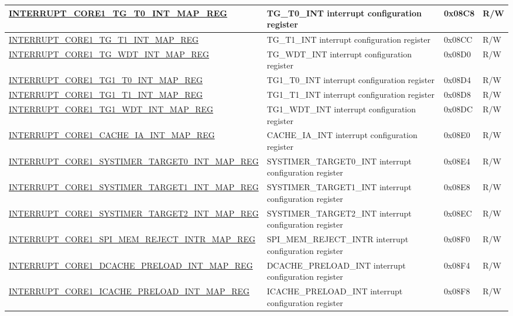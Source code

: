 \begin{landscape}
\begin{longtable}{ | p{10cm} | p{10.2cm} | p{1.3cm} | p{1cm} | }
\hyperref[regdesc:INTERRUPTCORE1TGT0INTMAPREG]{INTERRUPT\_CORE1\_TG\_T0\_INT\_MAP\_REG} & TG\_T0\_INT interrupt configuration register & 0x08C8 & R/W \\ \hline
\hyperref[regdesc:INTERRUPTCORE1TGT1INTMAPREG]{INTERRUPT\_CORE1\_TG\_T1\_INT\_MAP\_REG} & TG\_T1\_INT interrupt configuration register & 0x08CC & R/W \\ \hline
\hyperref[regdesc:INTERRUPTCORE1TGWDTINTMAPREG]{INTERRUPT\_CORE1\_TG\_WDT\_INT\_MAP\_REG} & TG\_WDT\_INT interrupt configuration register & 0x08D0 & R/W \\ \hline
\hyperref[regdesc:INTERRUPTCORE1TG1T0INTMAPREG]{INTERRUPT\_CORE1\_TG1\_T0\_INT\_MAP\_REG} & TG1\_T0\_INT interrupt configuration register & 0x08D4 & R/W \\ \hline
\hyperref[regdesc:INTERRUPTCORE1TG1T1INTMAPREG]{INTERRUPT\_CORE1\_TG1\_T1\_INT\_MAP\_REG} & TG1\_T1\_INT interrupt configuration register & 0x08D8 & R/W \\ \hline
\hyperref[regdesc:INTERRUPTCORE1TG1WDTINTMAPREG]{INTERRUPT\_CORE1\_TG1\_WDT\_INT\_MAP\_REG} & TG1\_WDT\_INT interrupt configuration register & 0x08DC & R/W \\ \hline
\hyperref[regdesc:INTERRUPTCORE1CACHEIAINTMAPREG]{INTERRUPT\_CORE1\_CACHE\_IA\_INT\_MAP\_REG} & CACHE\_IA\_INT interrupt configuration register & 0x08E0 & R/W \\ \hline
\hyperref[regdesc:INTERRUPTCORE1SYSTIMERTARGET0INTMAPREG]{INTERRUPT\_CORE1\_SYSTIMER\_TARGET0\_INT\_MAP\_REG} & SYSTIMER\_TARGET0\_INT interrupt configuration register & 0x08E4 & R/W \\ \hline
\hyperref[regdesc:INTERRUPTCORE1SYSTIMERTARGET1INTMAPREG]{INTERRUPT\_CORE1\_SYSTIMER\_TARGET1\_INT\_MAP\_REG} & SYSTIMER\_TARGET1\_INT interrupt configuration register & 0x08E8 & R/W \\ \hline
\hyperref[regdesc:INTERRUPTCORE1SYSTIMERTARGET2INTMAPREG]{INTERRUPT\_CORE1\_SYSTIMER\_TARGET2\_INT\_MAP\_REG} & SYSTIMER\_TARGET2\_INT interrupt configuration register & 0x08EC & R/W \\ \hline
\hyperref[regdesc:INTERRUPTCORE1SPIMEMREJECTINTRMAPREG]{INTERRUPT\_CORE1\_SPI\_MEM\_REJECT\_INTR\_MAP\_REG} & SPI\_MEM\_REJECT\_INTR interrupt configuration register & 0x08F0 & R/W \\ \hline
\hyperref[regdesc:INTERRUPTCORE1DCACHEPRELOADINTMAPREG]{INTERRUPT\_CORE1\_DCACHE\_PRELOAD\_INT\_MAP\_REG} & DCACHE\_PRELOAD\_INT interrupt configuration register & 0x08F4 & R/W \\ \hline
\hyperref[regdesc:INTERRUPTCORE1ICACHEPRELOADINTMAPREG]{INTERRUPT\_CORE1\_ICACHE\_PRELOAD\_INT\_MAP\_REG} & ICACHE\_PRELOAD\_INT interrupt configuration register & 0x08F8 & R/W \\ \hline

\end{longtable}
\end{landscape}
